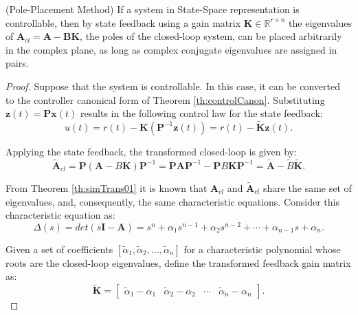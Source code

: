 \documentclass[a4paper,11pt]{book}
\numberwithin{figure}{chapter}
\numberwithin{equation}{chapter}
\numberwithin{table}{chapter}
\newtheorem{theorem}{Theorem}[chapter]
\theoremstyle{definition}
\newcounter{boxed-theorem}
\newenvironment{boxed-theorem}[1]
{\colorlet{shadecolor}{pastelBlue2!5} \begin{shaded} \begin{theorem}{#1}}
{\end{theorem} \end{shaded}}
\newcounter{boxed-lemma}
\newcounter{boxed-definition}
\newcounter{boxed-example}
\begin{document}
\begin{boxed-theorem}{(Pole-Placement Method)} \label{th:polePlace}
    If a system in State-Space representation is controllable, then by state feedback using a gain matrix $\bm{K} \in \mathbb{R}^{r \times n}$ the eigenvalues of $\bm{A}_{cl}=\bm{A}-\bm{B}\bm{K}$, the poles of the closed-loop system, can be placed arbitrarily in the complex plane, as long as complex conjugate eigenvalues are assigned in pairs.
\end{boxed-theorem} 

\begin{proof}
    Suppose that the system is controllable. In this case, it can be converted to the controller canonical form of Theorem \ref{th:controlCanon}. Substituting $\bm{z}(t) = \bm{P} \bm{x}(t)$ results in the following control law for the state feedback:
    \begin{equation}
        u(t) = r(t) - \bm{K} \left( \bm{P}^{-1} \bm{z}(t) \right) = r(t) - \tilde{\bm{K}} \bm{z}(t)
    .\end{equation}
    
    \noindent Applying the state feedback, the transformed closed-loop is given by:
    \begin{equation} \label{eq:fdbckContrCanon}
    \tilde{\bm{A}}_{cl} = \bm{P} (\bm{A} - B \bm{K}) \bm{P}^{-1} = \bm{P} \bm{A} \bm{P}^{-1} - \bm{P} B \bm{K} \bm{P}^{-1} = \tilde{\bm{A}} - \tilde{B} \tilde{\bm{K}}
    .\end{equation}   
    
    \noindent From Theorem \ref{th:simTrans01} it is known that $\bm{A}_{cl}$ and $\tilde{\bm{A}}_{cl}$ share the same set of eigenvalues, and, consequently, the same characteristic equations. Consider this characteristic equation as:
    \begin{equation}
        \Delta(s) = det(s\bm{I} - \bm{A}) = s^n + \alpha_1 s^{n-1} + \alpha_2 s^{n-2} + \cdots + \alpha_{n-1} s + \alpha_n
    .\end{equation}
    
    \noindent Given a set of coefficients $[\tilde{\alpha}_1, \tilde{\alpha}_2, ..., \tilde{\alpha}_n]$ for a characteristic polynomial whose roots are the closed-loop eigenvalues, define the transformed feedback gain matrix as:
    \begin{equation}
        \tilde{\bm{K}} = \begin{bmatrix} \tilde{\alpha}_1 - \alpha_1 & \tilde{\alpha}_2 - \alpha_2 & \cdots & \tilde{\alpha}_n - \alpha_n \end{bmatrix}
    .\end{equation}
    

\end{proof}
\end{document}
